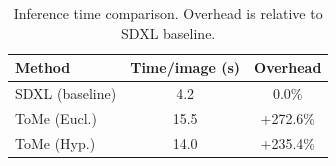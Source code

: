 \begin{table}[t]
\centering
\caption{Inference time comparison. Overhead is relative to SDXL baseline.}
\label{tab:time_complexity}
\begin{tabular}{l|cc}
\toprule
Method & Time/image (s) & Overhead \\
\midrule
SDXL (baseline) & 4.2 & 0.0\% \\
ToMe (Eucl.) & 15.5 & +272.6\% \\
ToMe (Hyp.) & 14.0 & +235.4\% \\
\bottomrule
\end{tabular}
\end{table}